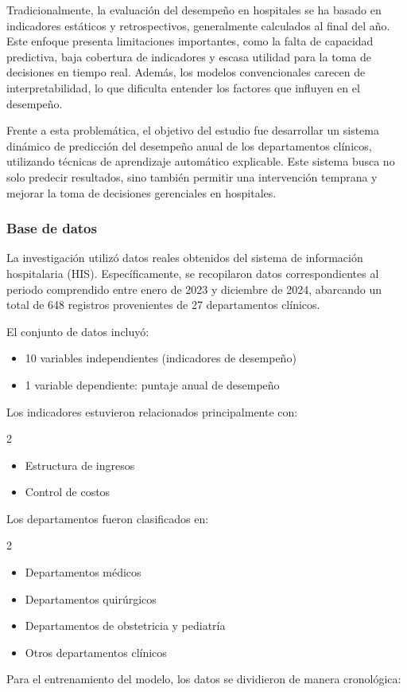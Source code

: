 Tradicionalmente, la evaluación del desempeño en hospitales se ha basado en indicadores estáticos y retrospectivos, generalmente calculados al final del año. Este enfoque presenta limitaciones importantes, como la falta de capacidad predictiva, baja cobertura de indicadores y escasa utilidad para la toma de decisiones en tiempo real. Además, los modelos convencionales carecen de interpretabilidad, lo que dificulta entender los factores que influyen en el desempeño.

Frente a esta problemática, el objetivo del estudio fue desarrollar un sistema dinámico de predicción del desempeño anual de los departamentos clínicos, utilizando técnicas de aprendizaje automático explicable. Este sistema busca no solo predecir resultados, sino también permitir una intervención temprana y mejorar la toma de decisiones gerenciales en hospitales.

\subsubsection{Base de datos}

La investigación utilizó datos reales obtenidos del sistema de información hospitalaria (HIS). Específicamente, se recopilaron datos correspondientes al periodo comprendido entre enero de 2023 y diciembre de 2024, abarcando un total de 648 registros provenientes de 27 departamentos clínicos.

El conjunto de datos incluyó:

	\begin{itemize}
		\item 10 variables independientes (indicadores de desempeño)
		\item 1 variable dependiente: puntaje anual de desempeño
	\end{itemize}

Los indicadores estuvieron relacionados principalmente con:

\begin{multicols}{2}
\begin{itemize}
    \item Estructura de ingresos
    \item Control de costos
\end{itemize}
\end{multicols}

Los departamentos fueron clasificados en:

\begin{multicols}{2}
\begin{itemize}
    \item Departamentos médicos
    \item Departamentos quirúrgicos
    \item Departamentos de obstetricia y pediatría
    \item Otros departamentos clínicos
\end{itemize}
\end{multicols}
Para el entrenamiento del modelo, los datos se dividieron de manera cronológica:

